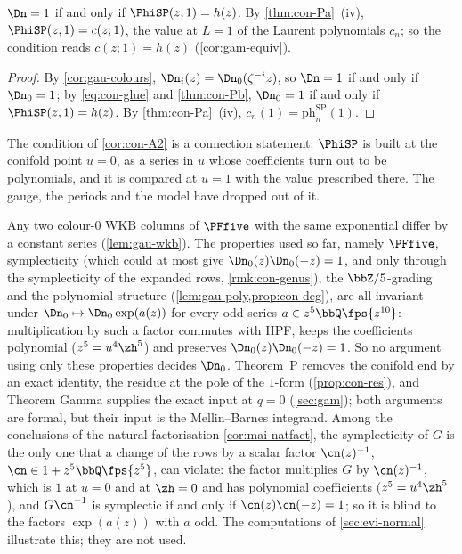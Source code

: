 \begin{cor}
\label{cor:con-A2}
$\Dn=1$ if and only if $\PhiSP(z,1)=h(z)$. By \cref{thm:con-Pa}~(iv), $\PhiSP(z,1)=c(z;1)$, the value at $L=1$ of the Laurent polynomials $c_n$; so the condition reads $c(z;1)=h(z)$ (\cref{cor:gam-equiv}).
\end{cor}

\begin{proof}
By \cref{cor:gau-colours}, $\Dn_i(z)=\Dn_0(\zeta^{-i}z)$, so $\Dn=1$ if and only if $\Dn_0=1$; by \eqref{eq:con-glue} and \cref{thm:con-Pb}, $\Dn_0=1$ if and only if $\PhiSP(z,1)=h(z)$. By \cref{thm:con-Pa}~(iv), $c_n(1)=\mathrm{ph}^{\mathrm{SP}}_n(1)$.
\end{proof}

The condition of \cref{cor:con-A2} is a connection statement: $\PhiSP$ is built at the conifold point $u=0$, as a series in $u$ whose coefficients turn out to be polynomials, and it is compared at $u=1$ with the value prescribed there. The gauge, the periods and the model have dropped out of it.

\begin{rmk}
\label{rmk:con-why}
Any two colour-$0$ WKB columns of $\PFfive$ with the same exponential differ by a constant series (\cref{lem:gau-wkb}). The properties used so far, namely $\PFfive$, symplecticity (which could at most give $\Dn_0(z)\Dn_0(-z)=1$, and only through the symplecticity of the expanded rows, \cref{rmk:con-genus}), the $\bbZ/5$-grading and the polynomial structure (\cref{lem:gau-poly,prop:con-deg}), are all invariant under $\Dn_0\mapsto\Dn_0\exp(a(z))$ for every odd series $a\in z^5\bbQ\fps{z^{10}}$: multiplication by such a factor commutes with HPF, keeps the coefficients polynomial ($z^5=u^4\zh^5$) and preserves $\Dn_0(z)\Dn_0(-z)=1$. So no argument using only these properties decides $\Dn_0$. Theorem~P removes the conifold end by an exact identity, the residue at the pole of the $1$-form (\cref{prop:con-res}), and Theorem Gamma supplies the exact input at $q=0$ (\cref{sec:gam}); both arguments are formal, but their input is the Mellin--Barnes integrand. Among the conclusions of the natural factorisation \cref{cor:mai-natfact}, the symplecticity of $G$ is the only one that a change of the rows by a scalar factor $\cn(z)^{-1}$, $\cn\in1+z^5\bbQ\fps{z^5}$, can violate: the factor multiplies $G$ by $\cn(z)^{-1}$, which is $1$ at $u=0$ and at $\zh=0$ and has polynomial coefficients ($z^5=u^4\zh^5$), and $G\cn^{-1}$ is symplectic if and only if $\cn(z)\cn(-z)=1$; so it is blind to the factors $\exp(a(z))$ with $a$ odd. The computations of \cref{sec:evi-normal} illustrate this; they are not used.
\end{rmk}

